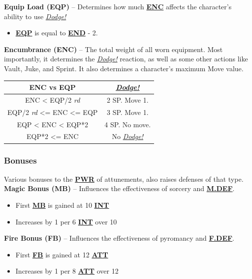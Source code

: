 \documentclass[12pt]{article}
\newcommand{\refto}[1]{\hyperlink{#1}{\textbf{#1}}}
\newcommand{\makeref}[1]{\hypertarget{#1}{\textbf{#1}}}
\newcommand{\reftoit}[1]{\hyperlink{#1}{\emph{#1}}}
\begin{document}
\begin{multicols*}{2}
\textbf{Equip Load (\makeref{EQP})} – Determines how much \refto{ENC} affects the character’s ability to use \reftoit{Dodge!}
\begin{itemize}
\item \refto{EQP} is equal to \refto{END} - 2.
\end{itemize}

\setlength{\tabcolsep}{6pt}
\renewcommand{\arraystretch}{1.5}

\columnbreak

\textbf{Encumbrance (\makeref{ENC})} – The total weight of all worn equipment. Most importantly, it determines the \reftoit{Dodge!} reaction, as well as some other actions like Vault, Juke, and Sprint. It also determines a character’s maximum Move value.

\begin{center}
\begin{tabular}{ |c|c| }
\hline
\textbf{ENC vs EQP} & \textbf{\reftoit{Dodge!}}\\
\hline
ENC < EQP/2 \emph{rd} & 2 SP.  Move 1.\\
\hline
EQP/2 \emph{rd} <= ENC <= EQP & 3 SP. Move 1.\\
\hline
EQP < ENC < EQP*2 & 4 SP. No move.\\
\hline
EQP*2 <= ENC & No \reftoit{Dodge!}\\ 
\hline
\end{tabular}
\end{center}

\subsubsection{Bonuses}
Various bonuses to the \refto{PWR} of attunements, also raises defenses of that type.\\

\textbf{Magic Bonus (\makeref{MB})} – Influences the effectiveness of sorcery and \refto{M.DEF}.
\begin{itemize}
\item First \refto{MB} is gained at 10 \refto{INT}
\item Increases by 1 per 6 \refto{INT} over 10
\end{itemize}

\textbf{Fire Bonus (\makeref{FB})} – Influences the effectiveness of pyromancy and \refto{F.DEF}.
\begin{itemize}
\item First \refto{FB} is gained at 12 \refto{ATT}
\item Increases by 1 per 8 \refto{ATT} over 12
\end{itemize}


\end{multicols*}
\end{document}
